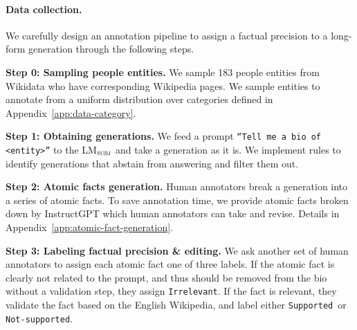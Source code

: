 \documentclass[11pt]{article}
\newcommand{\subjectLM}{LM$_\textsc{subj}$}
\newcommand{\sLabel}{\texttt{Supported}}
\newcommand{\nsLabel}{\texttt{Not-supported}}
\newcommand{\irLabel}{\texttt{Irrelevant}}
\newcommand{\pw}[1]{%
}
\begin{document}
\paragraph{Data collection.}
We carefully design an annotation pipeline to assign a factual precision to a long-form generation through the following steps.

\vspace{.4em}
\noindent \textbf{Step 0: Sampling people entities.}
We sample 183 people entities from Wikidata who have %
corresponding Wikipedia pages.
We sample entities to annotate from a uniform distribution over categories defined in Appendix~\ref{app:data-category}. %

\vspace{.4em}
\noindent \textbf{Step 1: Obtaining generations.} We feed a prompt \texttt{``Tell me a bio of <entity>''} to the \subjectLM{} and take a generation as it is. %
We implement rules to identify generations that abstain from answering and filter them out. %

\vspace{.4em}
\noindent \textbf{Step 2: Atomic facts generation.}
Human annotators break a generation into a series of atomic facts.
To save annotation time, we provide atomic facts broken down by InstructGPT which human annotators can take and revise. Details in Appendix~\ref{app:atomic-fact-generation}.

\vspace{.4em}
\noindent \textbf{Step 3: Labeling factual precision \& editing.}
We ask another set of human annotators to assign each atomic fact one of three labels. If the atomic fact is clearly not related to the prompt, and thus should be removed from the bio without a validation step, they assign \irLabel. If the fact is relevant, they validate the fact based on the English Wikipedia, and label either \sLabel\ or \nsLabel. %
\end{document}

